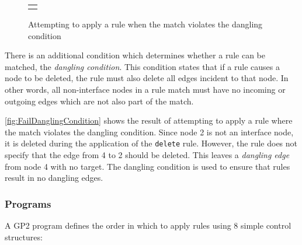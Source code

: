 \documentclass[authoryearcitations]{UoYCSproject}
\begin{document}
\begin{figure}
\begin{framed}
\begin{center}
\begin{tabular}{l}
\begin{tikzpicture}
            \end{tikzpicture}

        \end{tabular}
    \end{center}
    \end{framed}
    \caption{Attempting to apply a rule when the match violates the dangling condition}
    \label{fig:FailDanglingCondition}
\end{figure}

There is an additional condition which determines whether a rule can be matched, the
\emph{dangling condition}. This condition states that if a rule causes a node to be
deleted, the rule must also delete all edges incident to that node. In
other words, all non-interface nodes in a rule match must have no incoming or outgoing
edges which are not also part of the match.

\autoref{fig:FailDanglingCondition} shows the result of attempting to apply a rule
where the match violates the dangling condition. Since node 2 is not an interface
node, it is deleted during the application of the \texttt{delete} rule. However, the
rule does not specify that the edge from 4 to 2 should be deleted. This leaves a
\emph{dangling edge} from node 4 with no target. The dangling condition is used to
ensure that rules result in no dangling edges.


\subsubsection{Programs}
\label{sec:Programs}

A GP2 program defines the order in which to apply rules using 8 simple control
structures:
\end{document}
